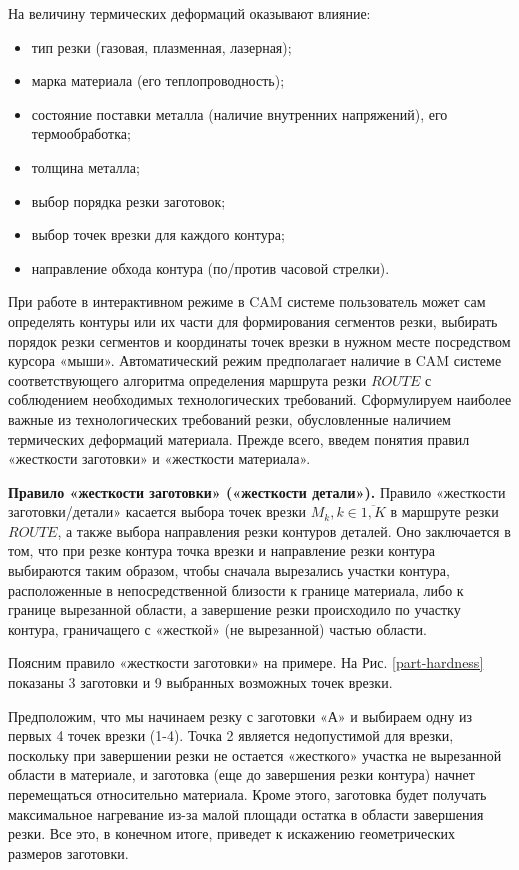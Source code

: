 \documentclass[12pt,twoside]{report}
\begin{document}
На величину термических деформаций оказывают влияние:
\begin{itemize}
\item	тип резки (газовая, плазменная, лазерная);
\item	марка материала (его теплопроводность);
\item	состояние поставки металла (наличие внутренних напряжений), его термообработка;
\item	толщина металла;
\item	выбор порядка резки заготовок;
\item	выбор точек врезки для каждого контура;
\item	направление обхода контура (по/против часовой стрелки).
\end{itemize}

При работе в интерактивном режиме в CAM системе
пользователь может сам определять контуры или их части
для формирования сегментов резки,
выбирать порядок резки сегментов и координаты точек врезки
в нужном месте посредством курсора «мыши».
Автоматический режим предполагает наличие в CAM системе
соответствующего алгоритма определения маршрута резки $ROUTE$
с соблюдением необходимых технологических требований.
Сформулируем наиболее важные из технологических требований резки,
обусловленные наличием термических деформаций материала.
Прежде всего, введем понятия правил «жесткости заготовки» и «жесткости материала».

{\bf Правило «жесткости заготовки» («жесткости детали»).}
Правило «жесткости заготовки/детали» касается выбора точек врезки
$M_k, k \in \overline{1,K}$
в маршруте резки  $ROUTE$,
а также выбора направления резки контуров деталей.
Оно заключается в том, что при резке контура точка
врезки и направление резки контура выбираются таким образом,
чтобы сначала вырезались участки контура,
расположенные в непосредственной близости к границе материала,
либо к границе вырезанной области,
а завершение резки происходило по участку контура,
граничащего с «жесткой» (не вырезанной) частью области.

Поясним правило «жесткости заготовки» на примере.
На Рис. \ref{part-hardness}
показаны 3 заготовки и 9 выбранных возможных точек врезки.

Предположим, что мы начинаем резку с заготовки «А»
и выбираем одну из первых 4 точек врезки (1-4).
Точка 2 является недопустимой для врезки,
поскольку при завершении резки не остается
«жесткого» участка не вырезанной области в материале,
и заготовка (еще до завершения резки контура)
начнет перемещаться относительно материала.
Кроме этого, заготовка будет получать максимальное
нагревание из-за малой площади остатка в области завершения резки.
Все это, в конечном итоге,
приведет к искажению геометрических размеров заготовки.
\end{document}

